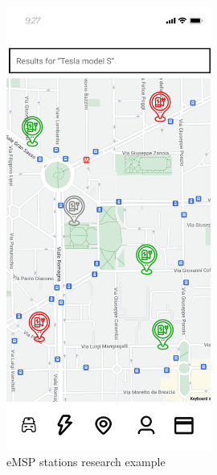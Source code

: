 \documentclass{Configuration_Files/PoliMi3i_thesis}
\begin{document}
\begin{figure}[H]
    \centering
    \includegraphics[width=0.6\textwidth]{Images/user-interface/emsp/eMSP (1)-06.png}
    \caption{eMSP stations research example}
\end{figure}
\end{document}
